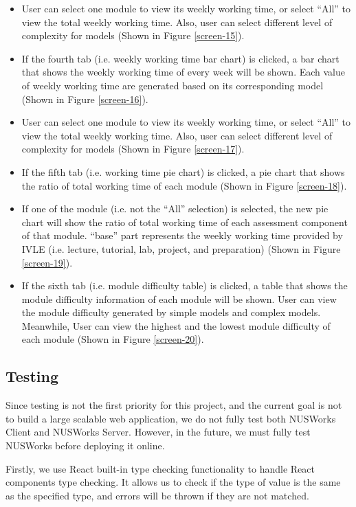 \documentclass[fyp]{socreport}
\begin{document}
\begin{itemize}
	\item User can select one module to view its weekly working time, or select “All” to view the total weekly working time. Also, user can select different level of complexity for models (Shown in Figure {\ref{screen-15}}).
	\item If the fourth tab (i.e. weekly working time bar chart) is clicked, a bar chart that shows the weekly working time of every week will be shown. Each value of weekly working time are generated based on its corresponding model (Shown in Figure {\ref{screen-16}}).
	\item User can select one module to view its weekly working time, or select “All” to view the total weekly working time. Also, user can select different level of complexity for models (Shown in Figure {\ref{screen-17}}).
	\item If the fifth tab (i.e. working time pie chart) is clicked, a pie chart that shows the ratio of total working time of each module (Shown in Figure {\ref{screen-18}}).
	\item If one of the module (i.e. not the “All” selection) is selected, the new pie chart will show the ratio of total working time of each assessment component of that module. “base” part represents the weekly working time provided by IVLE (i.e. lecture, tutorial, lab, project, and preparation) (Shown in Figure {\ref{screen-19}}).
	\item If the sixth tab (i.e. module difficulty table) is clicked, a table that shows the module difficulty information of each module will be shown. User can view the module difficulty generated by simple models and complex models. Meanwhile, User can view the highest and the lowest module difficulty of each module (Shown in Figure {\ref{screen-20}}).
\end{itemize}

\subsection{Testing}
Since testing is not the first priority for this project, and the current goal is not to build a large scalable web application, we do not fully test both NUSWorks Client and NUSWorks Server. However, in the future, we must fully test NUSWorks before deploying it online.

Firstly, we use React built-in type checking functionality to handle React components type checking. It allows us to check if the type of value is the same as the specified type, and errors will be thrown if they are not matched.
\end{document}
